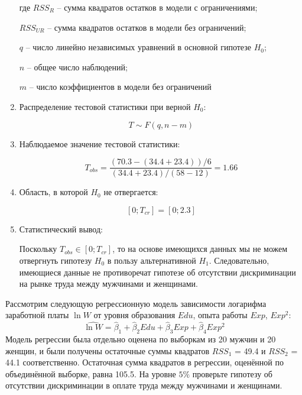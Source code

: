\documentclass[pdftex,11pt,openany]{book}\usepackage[]{graphicx}\usepackage[]{color}
\begin{document}
\begin{solution}
\begin{enumerate}
где $RSS_R$ -- сумма квадратов остатков в модели с ограничениями;

$RSS_{UR}$ -- сумма квадратов остатков в модели без ограничений;

$q$ -- число линейно независимых уравнений в основной гипотезе $H_0$;

$n$ -- общее число наблюдений;

$m$ -- число коэффициентов в модели без ограничений

\item Распределение тестовой статистики при верной $H_0$:

\[
T \sim F(q,n-m)
\]

\item Наблюдаемое значение тестовой статистики:

\[
T_{obs} = \frac{(70.3-(34.4+23.4))/6}{(34.4+23.4)/(58-12)}=1.66
\]

\item Область, в которой $H_0$ не отвергается:

\[
[0;T_{cr}]=[0;2.3]
\]

\item Статистический вывод:

Поскольку $T_{obs} \in [0;T_{cr}]$, то на основе имеющихся данных мы не можем отвергнуть гипотезу $H_0$ в пользу альтернативной $H_1$. Следовательно, имеющиеся данные не противоречат гипотезе об отсутствии дискриминации на рынке труда между мужчинами и женщинами.

\end{enumerate}
\end{solution}

\begin{problem}  %
 Рассмотрим следующую регрессионную модель зависимости логарифма заработной платы $\ln W$ от уровня образования $Edu$, опыта работы $Exp$, $Exp^2$:
\[
\widehat{\ln W}=\hat{\beta}_1+\hat{\beta}_2Edu+\hat{\beta}_3Exp+\hat{\beta}_4Exp^2
\]
Модель регрессии была отдельно оценена по выборкам из 20 мужчин и 20 женщин, и были получены остаточные суммы квадратов $RSS_1$ = 49.4 и $RSS_2$ = 44.1 соответственно. Остаточная сумма квадратов в регрессии, оценённой по объединённой выборке, равна 105.5. На уровне $ 5\%$ проверьте гипотезу об отсутствии дискриминации в оплате труда между мужчинами и женщинами.
\end{problem}

\begin{solution}
\end{solution}
\end{document}
